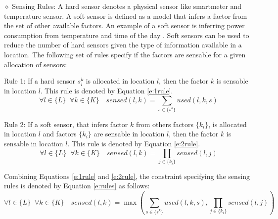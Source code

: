 \documentclass[]{interact}
\theoremstyle{plain}%
\theoremstyle{definition}
\theoremstyle{remark}
\begin{document}
\noindent $\diamond$ Sensing Rules: A hard sensor denotes a physical sensor like smartmeter and temperature sensor. 
A soft sensor is defined as a model that infers a factor from the set of other available factors. An example of a soft sensor is inferring power consumption from temperature and time of the day \citep{anshuleEnergy16}.  
Soft sensors can be used to reduce the number of hard sensors given the type of information available in a location.  
The following set of rules specify if the factors are sensable  
 for a given allocation of sensors: %

  \noindent Rule 1: If a hard sensor $s_i^k$ is allocated in location $l$, then the factor $k$ is sensable in location $l$. 
  This rule is denoted by Equation \eqref{e:1rule}.
\begin{equation}
  \label{e:1rule}
  \forall l \in \{L\} \;\; \forall k \in \{K\} \quad sensed(l,k) = 
  \sum_{s \in \{s^k\}}  used(l,k,s)  
  \end{equation}

  \noindent Rule 2: If a soft sensor, that infers factor $k$ from others factors $\{k_i\}$, is allocated in location $l$ and factors $\{k_i\}$ are sensable in location $l$, then the factor $k$ is sensable in location $l$.
  This rule is denoted by Equation \eqref{e:2rule}.
\begin{equation}
  \label{e:2rule}
  \forall l \in \{L\} \;\; \forall k \in \{K\} \quad sensed(l,k) = 
  \prod_{j \in \{k_i\}} sensed(l,j)
  \end{equation}

Combining Equations \eqref{e:1rule} and \eqref{e:2rule}, the constraint specifying the sensing rules is denoted by Equation \eqref{e:rules} as follows: 
\begin{equation}
  \label{e:rules}
  \forall l \in \{L\} \;\; \forall k \in \{K\} \quad sensed(l,k) = \max \left(
  \sum_{s \in \{s^k\}}  used(l,k,s) , 
  \prod_{j \in \{k_i\}} sensed(l,j)
  \right)
  \end{equation}
\end{document}
